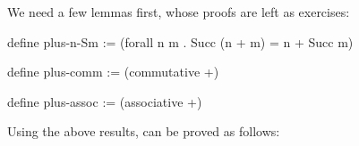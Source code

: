 %
%
We need a few lemmas first, whose proofs are left as exercises:
\begin{tcAthena}
define plus-n-Sm := (forall n m . Succ (n + m) = n + Succ m)

define plus-comm := (commutative +)

define plus-assoc := (associative +)
\end{tcAthena}
Using the above results,  can be proved as follows:
\begin{tcAthena}

\end{tcAthena}
